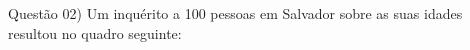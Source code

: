 
\noindent \textcolor{COLOR1}{Questão 02)} Um inquérito a 100 pessoas em Salvador sobre as suas idades resultou no quadro seguinte:
\\
